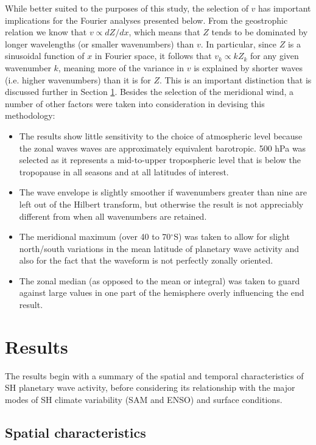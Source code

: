 While better suited to the purposes of this study, the selection of $v$ has important implications for the Fourier analyses presented below. From the geostrophic relation we know that $v \propto dZ / dx$, which means that $Z$ tends to be dominated by longer wavelengths (or smaller wavenumbers) than $v$. In particular, since $Z$ is a sinusoidal function of $x$ in Fourier space, it follows that $v_k \propto k Z_k$ for any given wavenumber $k$, meaning more of the variance in $v$ is explained by shorter waves (i.e. higher wavenumbers) than it is for $Z$. This is an important distinction that is discussed further in Section \ref{s:zw_results}. Besides the selection of the meridional wind, a number of other factors were taken into consideration in devising this methodology:
\begin{itemize}
\item The results show little sensitivity to the choice of atmospheric level because the zonal waves waves are approximately equivalent barotropic. 500 hPa was selected as it represents a mid-to-upper tropospheric level that is below the tropopause in all seasons and at all latitudes of interest.
\item The wave envelope is slightly smoother if wavenumbers greater than nine are left out of the Hilbert transform, but otherwise the result is not appreciably different from when all wavenumbers are retained.
\item The meridional maximum (over 40 to 70$^{\circ}$S) was taken to allow for slight north/south variations in the mean latitude of planetary wave activity and also for the fact that the waveform is not perfectly zonally oriented. 
\item The zonal median (as opposed to the mean or integral) was taken to guard against large values in one part of the hemisphere overly influencing the end result.
\end{itemize}

      

\section{Results}\label{s:zw_results}

The results begin with a summary of the spatial and temporal characteristics of SH planetary wave activity, before considering its relationship with the major modes of SH climate variability (SAM and ENSO) and surface conditions. 

\subsection{Spatial characteristics}\label{s:zw_spatial_characteristics}

